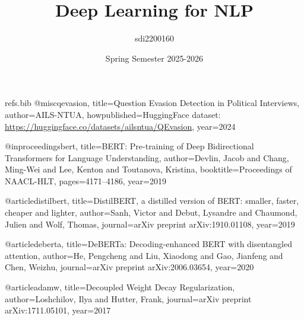 \begin{filecontents*}{refs.bib}
@misc{qevasion,
  title={Question Evasion Detection in Political Interviews},
  author={AILS-NTUA},
  howpublished={HuggingFace dataset: \url{https://huggingface.co/datasets/ailsntua/QEvasion}},
  year={2024}
}

@inproceedings{bert,
  title={{BERT}: Pre-training of Deep Bidirectional Transformers for Language Understanding},
  author={Devlin, Jacob and Chang, Ming-Wei and Lee, Kenton and Toutanova, Kristina},
  booktitle={Proceedings of NAACL-HLT},
  pages={4171--4186},
  year={2019}
}

@article{distilbert,
  title={DistilBERT, a distilled version of {BERT}: smaller, faster, cheaper and lighter},
  author={Sanh, Victor and Debut, Lysandre and Chaumond, Julien and Wolf, Thomas},
  journal={arXiv preprint arXiv:1910.01108},
  year={2019}
}

@article{deberta,
  title={{DeBERTa}: Decoding-enhanced {BERT} with disentangled attention},
  author={He, Pengcheng and Liu, Xiaodong and Gao, Jianfeng and Chen, Weizhu},
  journal={arXiv preprint arXiv:2006.03654},
  year={2020}
}

@article{adamw,
  title={Decoupled Weight Decay Regularization},
  author={Loshchilov, Ilya and Hutter, Frank},
  journal={arXiv preprint arXiv:1711.05101},
  year={2017}
}
\end{filecontents*}

\documentclass[12pt]{fphw}

\usepackage[utf8]{inputenc}
\usepackage[T1]{fontenc}
\usepackage{mathpazo}
\usepackage{graphicx}
\usepackage{booktabs}
\usepackage{hyperref}
\usepackage{amsmath}
\usepackage{xcolor}
\usepackage{tabularx}
\usepackage[section]{placeins}

\hypersetup{
    colorlinks=true,
    linkcolor=blue,
    filecolor=magenta,
    urlcolor=cyan,
}

\title{Deep Learning for NLP}
\author{sdi2200160}
\date{Spring Semester 2025-2026}

\newcommand{\hwonebestf}{0.45}
\newcommand{\hwonewikitwo}{0.39}
\newcommand{\hwonetwitter}{0.38}
\newcommand{\bertf}{0.5561}
\newcommand{\bertdeltatfidf}{+0.1061}
\newcommand{\bertdeltaglove}{+0.1661}
\newcommand{\distilbertf}{0.5066}
\newcommand{\distilbertdeltatfidf}{+0.0566}
\newcommand{\distilbertdeltaglove}{+0.1166}
\newcommand{\debertaf}{0.2672}
\newcommand{\debertadeltatfidf}{-0.1828}
\newcommand{\debertadeltaglove}{-0.1228}


